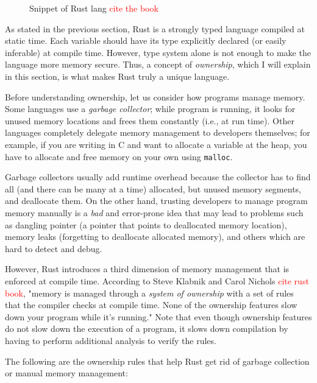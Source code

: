 \begin{figure*}[ht]
    \begin{center}
    
    \end{center}
    \caption{Snippet of Rust lang \textcolor{red}{cite the book}}
    \label{rustex1}
\end{figure*}

As stated in the previous section, Rust is a strongly typed language compiled
at static time.  Each variable should have its type explicitly declared (or
easily inferable) at compile time. However, type system alone is not enough to
make the language more memory secure. Thus, a concept of \textit{ownership},
which I will explain in this section, is what makes Rust truly a unique
language.

Before understanding ownership, let us consider how programs manage memory.
Some languages use a \textit{garbage collector}; while program is running,
it looks for unused memory locations and frees them constantly (i.e., at
run time). Other languages completely delegate memory management to developers
themselves; for example, if you are writing in C and want to allocate a variable at
the heap, you have to allocate and free memory on your own using \texttt{malloc}.

Garbage collectors usually add runtime overhead because the collector has to find
all (and there can be many at a time) allocated, but unused memory segments,
and deallocate them. On the other hand, trusting developers to manage program
memory manually is a \textit{bad} and error-prone idea that may lead to problems such
as dangling pointer (a pointer that points to deallocated memory
location), memory leaks (forgetting to deallocate allocated memory), and others which
are hard to detect and debug.

However, Rust introduces a third dimension of memory management
that is enforced at compile time. According to Steve Klabnik and Carol Nichols
\textcolor{red}{cite rust book}, "memory is managed through a \textit{system of
ownership} with a set of rules that the compiler checks at compile time. None of
the ownership features slow down your program while it's running." Note
that even though ownership features do not slow down the execution of a program,
it slows down compilation by having to perform additional analysis
to verify the rules.

The following are the ownership rules that help Rust get rid of garbage collection
or manual memory management:

